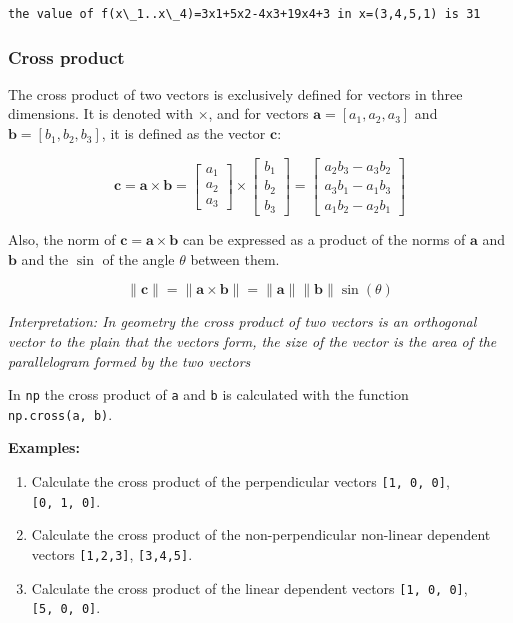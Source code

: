 \documentclass[11pt]{article}
\begin{document}
    \begin{Verbatim}[commandchars=\\\{\}]
the value of f(x\_1..x\_4)=3x1+5x2-4x3+19x4+3 in x=(3,4,5,1) is 31
    \end{Verbatim}

    \subsubsection{Cross product}\label{cross-product}

The cross product of two vectors is exclusively defined for vectors in
three dimensions. It is denoted with \(\times\), and for vectors
\(\pmb{a} = [a_1, a_2, a_3]\) and \(\pmb{b} = [b_1, b_2, b_3]\), it is
defined as the vector \(\pmb{c}\):

\[
\pmb{c} = \pmb{a} \times \pmb{b} = \begin{bmatrix} a_1 \\ a_2 \\ a_3 \end{bmatrix} \times \begin{bmatrix} b_1 \\ b_2 \\ b_3 \end{bmatrix} = \begin{bmatrix} a_2 b_3 - a_3 b_2 \\ a_3 b_1 - a_1 b_3 \\ a_1 b_2 - a_2 b_1 \end{bmatrix}
\]

Also, the norm of \(\pmb{c} = \pmb{a} \times \pmb{b}\) can be expressed
as a product of the norms of \(\pmb{a}\) and \(\pmb{b}\) and the
\(\sin\) of the angle \(\theta\) between them.

\[
\|\pmb{c}\| = \|\pmb{a} \times \pmb{b}\| = \|\pmb{a}\| \|\pmb{b}\| \sin(\theta)
\]

\emph{Interpretation: In geometry the cross product of two vectors is an
orthogonal vector to the plain that the vectors form, the size of the
vector is the area of the parallelogram formed by the two vectors}

In \texttt{np} the cross product of \texttt{a} and \texttt{b} is
calculated with the function \texttt{np.cross(a,\ b)}.

\textbf{Examples:}

\begin{enumerate}
\def\labelenumi{\arabic{enumi}.}
\item
  Calculate the cross product of the perpendicular vectors
  \texttt{{[}1,\ 0,\ 0{]}}, \texttt{{[}0,\ 1,\ 0{]}}.
\item
  Calculate the cross product of the non-perpendicular non-linear
  dependent vectors \texttt{{[}1,2,3{]}}, \texttt{{[}3,4,5{]}}.
\item
  Calculate the cross product of the linear dependent vectors
  \texttt{{[}1,\ 0,\ 0{]}}, \texttt{{[}5,\ 0,\ 0{]}}.
\end{enumerate}
\end{document}
